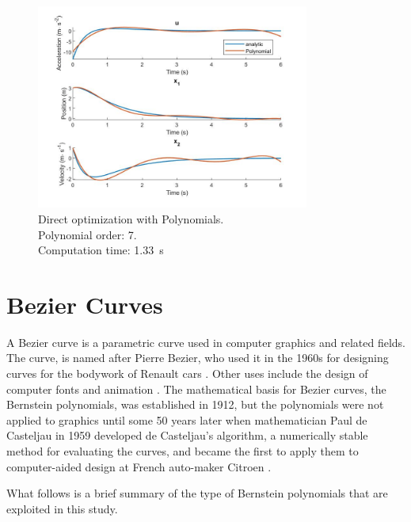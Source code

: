 \begin{figure}[h!]
\centering
\includegraphics[width=0.8\textwidth]{Images/solution_pol.jpg}
\caption{Direct optimization with Polynomials. \\ Polynomial order: 7. \\
Computation time: \SI{1.33}{\second}}
\label{fig:solution_pol}
\end{figure}



\section{Bezier Curves}
\label{sec:bezcurves}
\par A Bezier curve is a parametric curve used in computer graphics and related fields. The curve, is named after Pierre Bezier, who used it in the 1960s for designing curves for the bodywork of Renault cars \cite{hazewinkelmichiel1997}.  Other uses include the design of computer fonts and animation \cite{hazewinkelmichiel1997}. 
The mathematical basis for Bezier curves, the Bernstein polynomials, was established in 1912, but the polynomials were not applied to graphics until some 50 years later when mathematician Paul de Casteljau in 1959 developed de Casteljau's algorithm, a numerically stable method for evaluating the curves, and became the first to apply them to computer-aided design at French auto-maker Citroen \cite{GeraldFarin2002}. 

\par What follows is a brief summary of the type of Bernstein polynomials that are exploited in this study.


